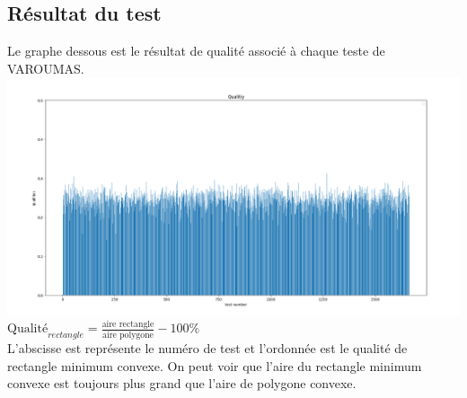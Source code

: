 \documentclass[14px]{article}
\begin{document}
\subsection{Résultat du test}
Le graphe dessous est le résultat de qualité associé à chaque teste de VAROUMAS.\\
\includegraphics[width=\textwidth]{testQuality.png}\\
$\text{Qualité}_{rectangle} = \frac{\text{aire rectangle}}{\text{aire polygone}} - 100\%$\\
L'abscisse est représente le numéro de test et l'ordonnée est le qualité de rectangle minimum convexe.
On peut voir que l'aire du rectangle minimum convexe est toujours plus grand que l'aire de polygone convexe.
\end{document}
